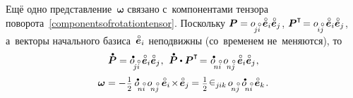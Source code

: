 \begin{otherlanguage}{russian}
Ещё одно представление~$\bm{\omega}$ связано с~компонентами тензора поворота~\eqref{componentsofrotationtensor}. Поскольку ${\bm{P} = \cosinematrix{\!j\mathcircabove{i}} \hspace{.4ex} \mathcircabove{\bm{e}}_i \mathcircabove{\bm{e}}_j}$, ${\bm{P}^{\T} \hspace{-0.32ex} = \cosinematrix{\hspace{-0.2ex}i\mathcircabove{j}} \hspace{.4ex} \mathcircabove{\bm{e}}_i \mathcircabove{\bm{e}}_j}$, а~векторы начального базиса~${\mathcircabove{\bm{e}}_i}$ неподвижны (со~временем не~меняются), то
\nopagebreak\vspace{.25em}\[ \mathdotabove{\bm{P}} = \cosinematrixdotted{\!j\mathcircabove{i}} \hspace{.4ex} \mathcircabove{\bm{e}}_i \mathcircabove{\bm{e}}_j
\hspace{.1ex} , \:\,
\mathdotabove{\bm{P}} \dotp \bm{P}^{\T} \hspace{-0.32ex} = \hspace{.1ex} \cosinematrixdotted{\hspace{-0.4ex}n\mathcircabove{i}} \hspace{.4ex}  \cosinematrix{\hspace{-0.4ex}n\mathcircabove{j}} \hspace{.4ex} \mathcircabove{\bm{e}}_i \mathcircabove{\bm{e}}_j
\hspace{.1ex}, \]
\nopagebreak\vspace{-0.64em}\begin{equation}
\bm{\omega} = - \hspace{.1ex} \smalldisplaystyleonehalf \hspace{.4ex} \cosinematrixdotted{\hspace{-0.4ex}n\mathcircabove{i}} \hspace{.4ex} \cosinematrix{\hspace{-0.4ex}n\mathcircabove{j}} \hspace{.5ex} \mathcircabove{\bm{e}}_i \hspace{-0.3ex}\times\hspace{-0.3ex} \mathcircabove{\bm{e}}_j \hspace{-0.1ex} =
\smalldisplaystyleonehalf \hspace{.2ex} \levicivita_{j\hspace{-0.06ex}ik} \hspace{.32ex} \cosinematrix{\hspace{-0.4ex}n\mathcircabove{j}} \hspace{.4ex} \cosinematrixdotted{\hspace{-0.4ex}n\mathcircabove{i}} \hspace{.4ex} \mathcircabove{\bm{e}}_k
\hspace{.2ex} .
\end{equation}


\end{otherlanguage}
